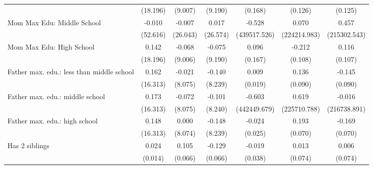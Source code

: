 {\begin{tabular}{l*{6}{c}}
                    &    (18.196)         &     (9.007)         &     (9.190)         &     (0.168)         &     (0.126)         &     (0.125)         \\
\addlinespace
Mom Max Edu: Middle School&      -0.010         &      -0.007         &       0.017         &      -0.528         &       0.070         &       0.457         \\
                    &    (52.616)         &    (26.043)         &    (26.574)         &(439517.526)         &(224214.983)         &(215302.543)         \\
\addlinespace
Mom Max Edu: High School&       0.142         &      -0.068         &      -0.075         &       0.096         &      -0.212\sym{*}  &       0.116         \\
                    &    (18.196)         &     (9.006)         &     (9.190)         &     (0.167)         &     (0.108)         &     (0.107)         \\
\addlinespace
Father max. edu.: less than middle school&       0.162         &      -0.021         &      -0.140         &       0.009         &       0.136         &      -0.145         \\
                    &    (16.313)         &     (8.075)         &     (8.239)         &     (0.019)         &     (0.090)         &     (0.090)         \\
\addlinespace
Father max. edu.: middle school&       0.173         &      -0.072         &      -0.101         &      -0.603         &       0.619         &      -0.016         \\
                    &    (16.313)         &     (8.075)         &     (8.240)         &(442449.679)         &(225710.788)         &(216738.891)         \\
\addlinespace
Father max. edu.: high school&       0.148         &       0.000         &      -0.148         &      -0.024         &       0.193\sym{**} &      -0.169\sym{*}  \\
                    &    (16.313)         &     (8.074)         &     (8.239)         &     (0.025)         &     (0.070)         &     (0.070)         \\
\addlinespace
Has 2 siblings      &       0.024         &       0.105         &      -0.129         &      -0.019         &       0.013         &       0.006         \\
                    &     (0.014)         &     (0.066)         &     (0.066)         &     (0.038)         &     (0.074)         &     (0.074)         \\

\end{tabular}}
